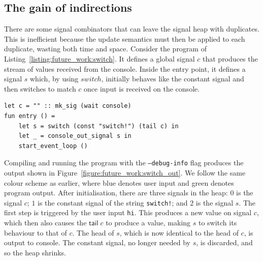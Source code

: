 
\subsection{The gain of indirections}


There are some signal combinators that can leave the signal heap with duplicates. This is inefficient because the update semantics must then be applied to each duplicate, wasting both time and space.  
Consider the program of Listing~\ref{listing:future_work:switch}. 
It defines a global signal $c$ that produces the stream of values received from the console. Inside the entry point, it defines a signal $s$ which, by using $switch$, initially behaves like the constant signal and then switches to match $c$ once input is received on the console.

\begin{lstlisting}[caption={Rizzo program using the switch combinator.}, label={listing:future_work:switch}]
let c = "" :: mk_sig (wait console)
fun entry () = 
    let s = switch (const "switch!") (tail c) in
    let _ = console_out_signal s in
    start_event_loop ()
\end{lstlisting}

Compiling and running the program with the \texttt{--debug-info} flag produces the output shown in Figure~\ref{figure:future_work:switch_out}.
We follow the same colour scheme as earlier, where blue denotes user input and green denotes program output.
After initialisation, there are three signals in the heap: $0$ is the signal $c$; $1$ is the constant signal of the string \texttt{switch!}; and $2$ is the signal $s$. 
The first step is triggered by the user input \texttt{hi}. This produces a new value on signal $c$, which then also causes the $\mathsf{tail} \; c$ to produce a value, making $s$ to switch its behaviour to that of $c$. The head of $s$, which is now identical to the head of $c$, is output to console.
The constant signal, no longer needed by $s$, is discarded, and so the heap shrinks.

